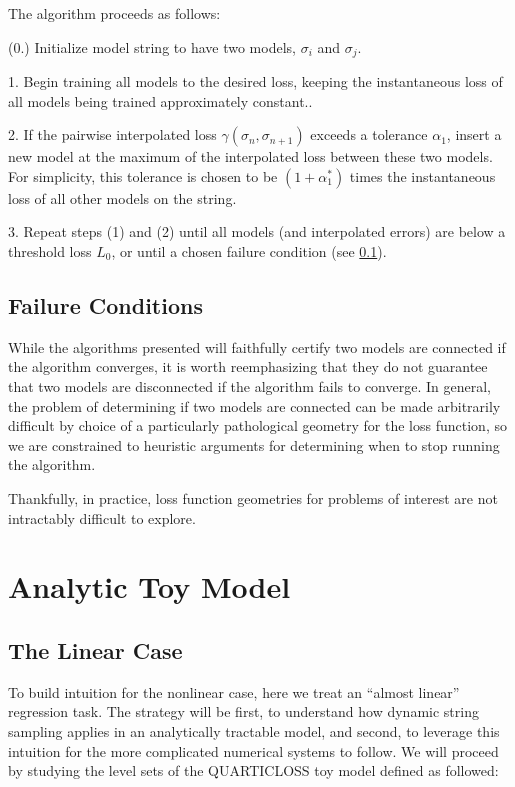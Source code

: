 \documentclass[twocolumn,superscriptaddress,aps,prb,floatfix]{revtex4-1}
\begin{document}
  The algorithm proceeds as follows:
  
  (0.) Initialize model string to have two models, $\sigma_i$ and $\sigma_j$.
  
  1. Begin training all models to the desired loss, keeping the instantaneous loss of all models being trained approximately constant..
  
  2. If the pairwise interpolated loss $\gamma(\sigma_n,\sigma_{n+1})$ exceeds a tolerance $\alpha_1$, insert a new model at the maximum of the interpolated loss between these two models.  For simplicity, this tolerance is chosen to be $(1 + \alpha_1^*)$ times the instantaneous loss of all other models on the string.  
  
  3. Repeat steps (1) and (2) until all models (and interpolated errors) are below a threshold loss $L_0$, or until a chosen failure condition (see \ref{sec:Fail}).
  
  \subsection{Failure Conditions}
  \label{sec:Fail}
  
  While the algorithms presented will faithfully certify two models are connected if the algorithm converges, it is worth reemphasizing that they do not guarantee that two models are disconnected if the algorithm fails to converge.  In general, the problem of determining if two models are connected can be made arbitrarily difficult by choice of a particularly pathological geometry for the loss function, so we are constrained to heuristic arguments for determining when to stop running the algorithm.
  
  Thankfully, in practice, loss function geometries for problems of interest are not intractably difficult to explore.
 

\section{Analytic Toy Model}
\label{sec:ToyModel}

\subsection{The Linear Case}
\label{sec:LinToy}

 To build intuition for the nonlinear case, here we treat an ``almost linear'' regression task.  The strategy will be first, to understand how dynamic string sampling applies in an analytically tractable model, and second, to leverage this intuition for the more complicated numerical systems to follow.  We will proceed by studying the level sets of the \rm{QUARTICLOSS} toy model defined as followed:
 
\end{document}
